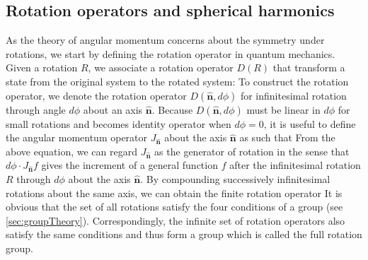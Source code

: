 \subsection{Rotation operators and spherical harmonics}

As the theory of angular
 momentum concerns about the symmetry under rotations, we start by defining the rotation operator in quantum 
 mechanics. Given a rotation $R$, we associate a rotation operator 
 $D(R)$ that transform a state from the original system to the rotated system:
To construct the rotation operator, we denote the rotation operator $D(\mathbf{\hat{n}}, d\phi)$ for infinitesimal 
rotation through angle $d\phi$ about an axis $\mathbf{\hat{n}}$. Because $D(\mathbf{\hat{n}}, d\phi)$ must be linear
in $d\phi$ for small rotations and becomes identity operator when $d\phi = 0$, it is useful to define the angular
 momentum operator $J_{\mathbf{\hat{n}}}$ about the axis $\mathbf{\hat{n}}$ as 
such that
From the above equation, we can regard $J_{\mathbf{\hat{n}}}$ as the generator of rotation in the sense that $ d\phi  \cdot J_{\mathbf{\hat{n}}} f$ gives the increment of a general function $f$ after the infinitesimal 
rotation $R$ through $d\phi$ about the axis $\mathbf{\hat{n}}$.
By compounding successively infinitesimal rotations about the same axis, we can obtain the finite rotation operator
It is obvious that the set of all rotations satisfy the four conditions of a group (see 
\autoref{sec:groupTheory}). Correspondingly, 
 the infinite set of rotation operators also satisfy the same conditions and thus form a group which is called the full 
rotation group. 


